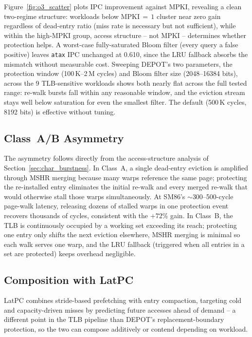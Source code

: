 Figure~\ref{fig:o3_scatter} plots IPC improvement against MPKI, revealing a clean
two-regime structure: workloads below MPKI$\,{=}\,1$ cluster near zero gain regardless of
dead-entry ratio (miss rate is necessary but not sufficient), while within the high-MPKI
group, access structure -- not MPKI -- determines whether protection helps. A worst-case
fully-saturated Bloom filter (every query a false positive) leaves \texttt{atax} IPC
unchanged at 0.610, since the LRU fallback absorbs the mismatch without measurable cost.
Sweeping DEPOT's two parameters, the protection window (100\,K--2\,M cycles) and Bloom
filter size (2048--16384 bits), across the 9 TLB-sensitive workloads shows both nearly flat
across the full tested range: re-walk bursts fall within any reasonable window, and the
eviction stream stays well below saturation for even the smallest filter. The default
(500\,K cycles, 8192 bits) is effective without tuning.

\subsection{Class~A/B Asymmetry}
\label{sec:disc_classes}
The asymmetry follows directly from the access-structure analysis of
Section~\ref{sec:char_burstness}. In Class~A, a single dead-entry eviction is amplified
through MSHR merging because many warps reference the same page; protecting the
re-installed entry eliminates the initial re-walk and every merged re-walk that would
otherwise stall those warps simultaneously. At SM86's $\sim$300--500-cycle page-walk
latency, releasing dozens of stalled warps in one protection event recovers thousands of
cycles, consistent with the $+72\%$ gain. In Class~B, the TLB is continuously occupied by
a working set exceeding its reach; protecting one entry only shifts the next eviction
elsewhere, MSHR merging is minimal so each walk serves one warp, and the LRU fallback
(triggered when all entries in a set are protected) keeps overhead negligible.

\subsection{Composition with LatPC}
\label{sec:o3_latpc}

LatPC combines stride-based prefetching with entry compaction, targeting cold and
capacity-driven misses by predicting future accesses ahead of demand -- a different point
in the TLB pipeline than DEPOT's replacement-boundary protection, so the two can compose
additively or contend depending on workload.

